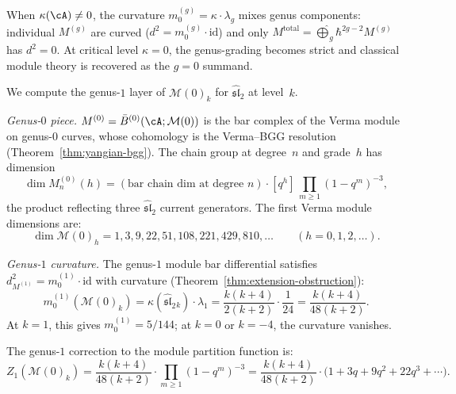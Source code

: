 \begin{remark}
\label{rem:curvature-genus-obstruction}
When $\kappa(\cA) \neq 0$, the curvature $m_0^{(g)} = \kappa \cdot \lambda_g$ mixes genus components: individual $M^{(g)}$ are curved ($d^2 = m_0^{(g)} \cdot \mathrm{id}$) and only $M^{\mathrm{total}} = \widehat{\bigoplus}_g \hbar^{2g-2} M^{(g)}$ has $d^2 = 0$.  At critical level $\kappa = 0$, the genus-grading becomes strict and classical module theory is recovered as the $g = 0$ summand.
\end{remark}

\begin{example}
\label{ex:verma-genus-graded}
We compute the genus-$1$ layer of $\mathcal{M}(0)_k$ for $\widehat{\mathfrak{sl}}_2$ at level~$k$.

\emph{Genus-$0$ piece.}
$M^{(0)} = \bar{B}^{(0)}(\cA; \mathcal{M}(0))$
is the bar complex of the Verma module on genus-$0$ curves, whose
cohomology is the Verma--BGG resolution
(Theorem~\ref{thm:yangian-bgg}).  The chain group
at degree~$n$ and grade~$h$ has dimension
\[
\dim M^{(0)}_n(h) = (\text{bar chain dim at degree } n)
\cdot [q^h]\,\prod_{m \geq 1}(1-q^m)^{-3},
\]
the product reflecting three $\widehat{\mathfrak{sl}}_2$
current generators.  The first Verma module dimensions are:
\begin{equation}\label{eq:verma-dims-sl2}
\dim \mathcal{M}(0)_h = 1, 3, 9, 22, 51, 108, 221, 429, 810,
\ldots \qquad (h = 0, 1, 2, \ldots).
\end{equation}

\emph{Genus-$1$ curvature.}
The genus-$1$ module bar differential satisfies
$d_{M^{(1)}}^2 = m_0^{(1)} \cdot \mathrm{id}$
with curvature (Theorem~\ref{thm:extension-obstruction}):
\begin{equation}\label{eq:verma-genus1-curvature}
m_0^{(1)}(\mathcal{M}(0)_k)
= \kappa(\widehat{\mathfrak{sl}}_2{}_k) \cdot \lambda_1
= \frac{k(k+4)}{2(k+2)} \cdot \frac{1}{24}
= \frac{k(k+4)}{48(k+2)}.
\end{equation}
At $k = 1$, this gives $m_0^{(1)} = 5/144$;
at $k = 0$ or $k = -4$, the curvature vanishes.

The genus-$1$ correction to the module partition function is:
\begin{equation}\label{eq:verma-genus1-correction}
Z_1(\mathcal{M}(0)_k)
= \frac{k(k+4)}{48(k+2)}
\cdot \prod_{m \geq 1}(1-q^m)^{-3}
= \frac{k(k+4)}{48(k+2)}
\cdot \bigl(1 + 3q + 9q^2 + 22q^3 + \cdots\bigr).
\end{equation}


\end{example}
